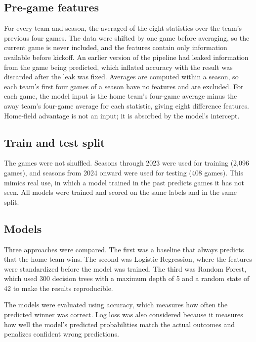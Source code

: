 \documentclass[sigconf,nonacm]{acmart}
\begin{document}
\subsection{Pre-game features}
For every team and season, the averaged of the eight statistics over the team’s previous four games. The data were shifted by one game before averaging, so the current game is never included, and the features contain only information available before kickoff. An earlier version of the pipeline had leaked information from the game being predicted, which inflated accuracy with the result was discarded after the leak was fixed. Averages are computed within a season, so each team's first four games of a season have no features and are excluded. For each game, the model input is the home team's four-game average minus the away team's four-game average for each statistic, giving eight difference features. Home-field advantage is not an input; it is absorbed by the model's intercept.

\subsection{Train and test split}
The games were not shuffled. Seasons through 2023 were used for training (2,096 games), and seasons from 2024 onward were used for testing (408 games). This mimics real use, in which a model trained in the past predicts games it has not seen. All models were trained and scored on the same labels and in the same split.

\subsection{Models}
Three approaches were compared. The first was a baseline that always predicts that the home team wins. The second was Logistic Regression, where the features were standardized before the model was trained. The third was Random Forest, which used 300 decision trees with a maximum depth of 5 and a random state of 42 to make the results reproducible.

The models were evaluated using accuracy, which measures how often the predicted winner was correct. Log loss was also considered because it measures how well the model's predicted probabilities match the actual outcomes and penalizes confident wrong predictions.
\end{document}
